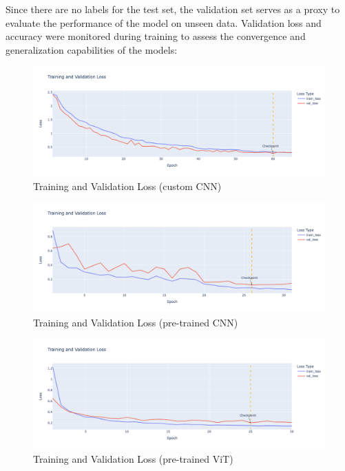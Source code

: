 Since there are no labels for the test set, the validation set serves as a proxy to evaluate the performance of the model on unseen data. Validation loss and accuracy were monitored during training to assess the convergence and generalization capabilities of the models:

\begin{figure}[htbp]
    \centerline{\includegraphics[width=0.9\linewidth]{../../resources/custom_cnn/loss.png}}
    \caption{Training and Validation Loss (custom CNN)}
    \label{fig:loss-custom-cnn}
\end{figure}

\begin{figure}[htbp]
    \centerline{\includegraphics[width=0.9\linewidth]{../../resources/resnet/loss.png}}
    \caption{Training and Validation Loss (pre-trained CNN)}
    \label{fig:loss-pretrained-cnn}
\end{figure}

\begin{figure}[htbp]
    \centerline{\includegraphics[width=0.9\linewidth]{../../resources/vit/loss.png}}
    \caption{Training and Validation Loss (pre-trained ViT)}
    \label{fig:loss-pretrained-vit}
\end{figure}

